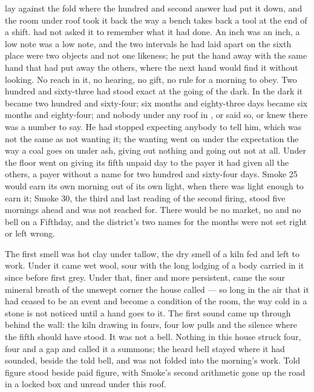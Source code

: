 
 lay against the fold where the hundred and second answer had put it down, and the room under  roof took it back the way a bench takes back a tool at the end of a shift.  had not asked it to remember what it had done. An inch was an inch, a low note was a low note, and the two intervals he had laid apart on the sixth place were two objects and not one likeness; he put the hand away with the same hand that had put away the others, where the next hand would find it without looking. No reach in it, no hearing, no gift, no rule for a morning to obey. Two hundred and sixty-three had stood exact at the going of the dark. In the dark it became two hundred and sixty-four; six months and eighty-three days became six months and eighty-four; and nobody under any roof in ,  or  said so, or knew there was a number to say. He had stopped expecting anybody to tell him, which was not the same as not wanting it; the wanting went on under the expectation the way a coal goes on under ash, giving out nothing and going out not at all. Under the floor  went on giving its fifth unpaid day to the payer it had given all the others, a payer without a name for two hundred and sixty-four days. Smoke 25 would earn its own morning out of its own light, when there was light enough to earn it; Smoke 30, the third and last reading of the second firing, stood five mornings ahead and was not reached for. There would be no market, no  and no bell on a Fifthday, and the district's two names for the months were not set right or left wrong.

The first smell was hot clay under tallow, the dry smell of a kiln fed and left to work. Under it came wet wool, sour with the long lodging of a body carried in it since before first grey. Under that, finer and more persistent, came the sour mineral breath of the unswept corner the house called  ---  so long in the air that it had ceased to be an event and become a condition of the room, the way cold in a stone is not noticed until a hand goes to it. The first sound came up through  behind the wall: the kiln drawing in fours, four low pulls and the silence where the fifth should have stood. It was not a bell. Nothing in this house struck four, four and a gap and called it a summons; the heard bell stayed where it had sounded, beside the told bell, and was not folded into the morning's work. Told figure stood beside paid figure, with Smoke's second arithmetic gone up the road in a locked box and unread under this roof.

